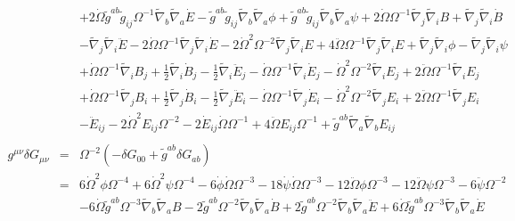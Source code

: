 \documentclass[10pt,letterpaper]{article}
\numberwithin{equation}{section}
\begin{document}
\begin{eqnarray}
&& + 2 \dot{\Omega} \tilde{g}^{ab} \tilde{g}_{ij} \Omega^{-1} \tilde{\nabla}_{b}\tilde{\nabla}_{a}\dot{E}
-  \tilde{g}^{ab} \tilde{g}_{ij} \tilde{\nabla}_{b}\tilde{\nabla}_{a}\phi
+ \tilde{g}^{ab} \tilde{g}_{ij} \tilde{\nabla}_{b}\tilde{\nabla}_{a}\psi
+ 2 \dot{\Omega} \Omega^{-1} \tilde{\nabla}_{j}\tilde{\nabla}_{i}B
+ \tilde{\nabla}_{j}\tilde{\nabla}_{i}\dot{B}\nonumber\\
&& -  \tilde{\nabla}_{j}\tilde{\nabla}_{i}\ddot{E}
- 2 \dot{\Omega} \Omega^{-1} \tilde{\nabla}_{j}\tilde{\nabla}_{i}\dot{E}
- 2 \dot{\Omega}^2 \Omega^{-2} \tilde{\nabla}_{j}\tilde{\nabla}_{i}E
+ 4 \ddot{\Omega} \Omega^{-1} \tilde{\nabla}_{j}\tilde{\nabla}_{i}E
+ \tilde{\nabla}_{j}\tilde{\nabla}_{i}\phi
-  \tilde{\nabla}_{j}\tilde{\nabla}_{i}\psi
\nonumber\\
&&+\dot{\Omega} \Omega^{-1} \tilde{\nabla}_{i}B_{j}
+ \tfrac{1}{2} \tilde{\nabla}_{i}\dot{B}_{j}
-  \tfrac{1}{2} \tilde{\nabla}_{i}\ddot{E}_{j}
-  \dot{\Omega} \Omega^{-1} \tilde{\nabla}_{i}\dot{E}_{j}
-  \dot{\Omega}^2 \Omega^{-2} \tilde{\nabla}_{i}E_{j}
+ 2 \ddot{\Omega} \Omega^{-1} \tilde{\nabla}_{i}E_{j}\nonumber\\
&& + \dot{\Omega} \Omega^{-1} \tilde{\nabla}_{j}B_{i}
+ \tfrac{1}{2} \tilde{\nabla}_{j}\dot{B}_{i}
-  \tfrac{1}{2} \tilde{\nabla}_{j}\ddot{E}_{i}
-  \dot{\Omega} \Omega^{-1} \tilde{\nabla}_{j}\dot{E}_{i}
-  \dot{\Omega}^2 \Omega^{-2} \tilde{\nabla}_{j}E_{i}
+ 2 \ddot{\Omega} \Omega^{-1} \tilde{\nabla}_{j}E_{i}
\nonumber\\
&&- \ddot{E}_{ij}
- 2 \dot{\Omega}^2 E_{ij} \Omega^{-2}
- 2 \dot{E}_{ij} \dot{\Omega} \Omega^{-1}
+ 4 \ddot{\Omega} E_{ij} \Omega^{-1}
+ \tilde{g}^{ab} \tilde{\nabla}_{a}\tilde{\nabla}_{b}E_{ij}
\\ \nonumber\\
g^{\mu\nu}\delta G_{\mu\nu}&=& \Omega^{-2}(-\delta G_{00} + \tilde g^{ab}\delta G_{ab})
\nonumber\\
&=& 6 \dot{\Omega}^2 \phi \Omega^{-4}
+ 6 \dot{\Omega}^2 \psi \Omega^{-4}
- 6 \dot{\phi} \dot{\Omega} \Omega^{-3}
- 18 \dot{\psi} \dot{\Omega} \Omega^{-3}
- 12 \ddot{\Omega} \phi \Omega^{-3}
- 12 \ddot{\Omega} \psi \Omega^{-3}
- 6 \ddot{\psi} \Omega^{-2}\nonumber\\
&& - 6 \dot{\Omega} \tilde{g}^{ab} \Omega^{-3} \tilde{\nabla}_{b}\tilde{\nabla}_{a}B
- 2 \tilde{g}^{ab} \Omega^{-2} \tilde{\nabla}_{b}\tilde{\nabla}_{a}\dot{B}
+ 2 \tilde{g}^{ab} \Omega^{-2} \tilde{\nabla}_{b}\tilde{\nabla}_{a}\ddot{E}
+ 6 \dot{\Omega} \tilde{g}^{ab} \Omega^{-3} \tilde{\nabla}_{b}\tilde{\nabla}_{a}\dot{E}\nonumber\\

\end{eqnarray}
\end{document}
